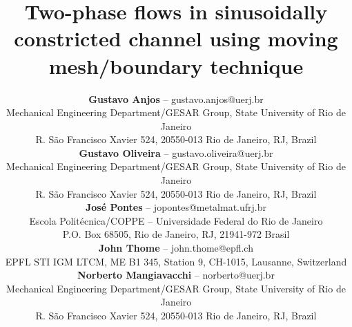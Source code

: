 \documentclass[12pt,fleqn]{article}
\begin{document}
	\title{Two-phase flows in sinusoidally constricted channel using
	       moving mesh/boundary technique}

	\author{\rm
		\scriptsize
		\begin{tabular}{l}
			\textbf{Gustavo Anjos} -- gustavo.anjos@uerj.br\\
			Mechanical Engineering Department/GESAR Group, State University of Rio de Janeiro\\
			R. S\~ao Francisco Xavier 524, 20550-013 Rio de Janeiro, RJ, Brazil\\
			\textbf{Gustavo Oliveira} -- gustavo.oliveira@uerj.br\\
			Mechanical Engineering Department/GESAR Group, State University of Rio de Janeiro\\
			R. S\~ao Francisco Xavier 524, 20550-013 Rio de Janeiro, RJ, Brazil\\
			\textbf{Jos\'e Pontes} -- jopontes@metalmat.ufrj.br\\
			Escola Polit\'ecnica/COPPE -- Universidade Federal do Rio de Janeiro\\
			P.O. Box 68505, Rio de Janeiro, RJ, 21941-972 Brasil\\
			\textbf{John Thome} -- john.thome@epfl.ch\\
			EPFL STI IGM LTCM, ME B1 345, Station 9, CH-1015, Lausanne, Switzerland\\
			\textbf{Norberto Mangiavacchi} -- norberto@uerj.br\\
			Mechanical Engineering Department/GESAR Group, State University of Rio de Janeiro\\
			R. S\~ao Francisco Xavier 524, 20550-013 Rio de Janeiro, RJ, Brazil
		\end{tabular}
	}	
\end{document}
